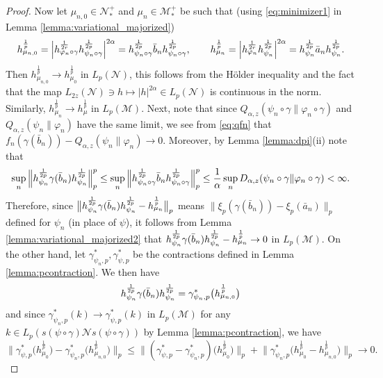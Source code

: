 \documentclass[12pt]{article}
\theoremstyle{definition}
\theoremstyle{remark}
\numberwithin{equation}{section}
\def\Me{\mathcal M}
\def\Ne{\mathcal N}
\def\ffi{\varphi}
\begin{document}
\begin{proof}
Now let $\mu_{n,0}\in \Ne_*^+$ and $\mu_n\in \Me_*^+$ be such that (using  \eqref{eq:minimizer1}
in Lemma \ref{lemma:variational_majorized})
\begin{align*}
h_{\mu_{n,0}}^{\frac 1p}=
\Big|h_{\ffi_n\circ\gamma}^{1\over 2r}h_{\psi_n\circ\gamma}^{1\over 2p}\Big|^{2\alpha}=
h_{\psi_n\circ\gamma}^{\frac 1{2p}}\bar b_{n}
h_{\psi_n\circ\gamma}^{\frac1{2p}},\qquad
h_{\mu_{n}}^{\frac1p}=\Big|h_{\ffi_n}^{1\over 2r}h_{\psi_n}^{1\over 2p}\Big|^{2\alpha}=
h_{\psi_n}^{\frac 1{2p}}\bar a_{n}h_{\psi_n}^{\frac1{2p}}. 
\end{align*}
Then $h_{\mu_{n,0}}^{\frac1p}\to h_{\mu_0}^{\frac1p}$ in $L_p(\Ne)$, this follows from the H\"older
inequality and the fact \cite{kosaki1984applicationsuc} that the map
$L_{2z}(\Ne)\ni h\mapsto |h|^{2\alpha}\in L_p(\Ne)$ is continuous in the norm. Similarly,
$h_{\mu_n}^{\frac1p}\to h_\mu^{\frac1p}$ in $L_p(\Me)$. 
Next, note that since
$Q_{\alpha,z}(\psi_n\circ\gamma\|\ffi_n\circ\gamma)$ and $Q_{\alpha,z}(\psi_n\|\ffi_n)$
have the same limit, we see from \eqref{eq:qfn} that
$f_n(\gamma(\bar b_{n}))-Q_{\alpha,z}(\psi_n\|\ffi_n)\to0$.
{\color{red}Moreover, by Lemma \ref{lemma:dpi}(ii) note that
\[
\sup_n\Big\|h_{\psi_n}^{\frac 1{2p}}\gamma(\bar b_{n})h_{\psi_n}^{1\over 2p}\Big\|_p^p
\le\sup_n\Big\|h_{\psi_n\circ\gamma}^{\frac 1{2p}}\bar b_{n}
h_{\psi_n\circ\gamma}^{\frac 1{2p}}\Big\|_p^p
\le{1\over\alpha}\sup_nD_{\alpha,z}(\psi_n\circ\gamma\|\ffi_n\circ\gamma)<\infty.
\]}
Therefore, {\color{red}since
$\big\|h_{\psi_n}^{\frac 1{2p}}\gamma(\bar b_{n})h_{\psi_n}^{1\over 2p}-h_{\mu_n}^{\frac1p}\big\|_p$
means $\|\xi_p(\gamma(\bar b_n))-\xi_p(\bar a_n)\|_p$ defined for $\psi_n$ (in place of $\psi$),
it follows} from Lemma \ref{lemma:variational_majorized2} that 
$h_{\psi_n}^{\frac 1{2p}}\gamma(\bar b_{n})h_{\psi_n}^{1\over 2p}-h_{\mu_n}^{\frac1p}\to
0$ in $L_p(\Me)$.  On the other hand, let $\gamma^*_{\psi_n,p}, \gamma^*_{\psi,p}$ be the
contractions defined in Lemma \ref{lemma:pcontraction}. We
then have 
\[
h_{\psi_n}^{\frac 1{2p}}\gamma(\bar b_{n})h_{\psi_n}^{1\over
2p}=\gamma_{\psi_{n},p}^*\bigl(h_{\mu_{n,0}}^{\frac1p}\bigr)
\]
and since $\gamma^*_{\psi_{n},p}(k)\to \gamma^*_{\psi,p}(k)$ in $L_p(\Me)$ for any
$k\in L_p(s(\psi\circ\gamma)\Ne s(\psi\circ\gamma))$ by Lemma \ref{lemma:pcontraction}, we have  
\[
\Big\|\gamma^*_{\psi,p}\bigl(h_{\mu_0}^{\frac1p}\bigr)-
\gamma_{\psi_{n},p}^*\bigl(h_{\mu_{n,0}}^{\frac1p}\bigr)\Big\|_p\le
\Big\|(\gamma^*_{\psi,p}-\gamma^*_{\psi_{n},p})\bigl(h_{\mu_0}^{\frac1p}\bigr)\Big\|_p+
\Big\|\gamma^*_{\psi_{n},p}\bigl(h_{\mu_0}^{\frac1p}-h_{\mu_{n,0}}^{\frac1p}\bigr)\Big\|_p\to 0.
\]
\end{proof}
\end{document}

